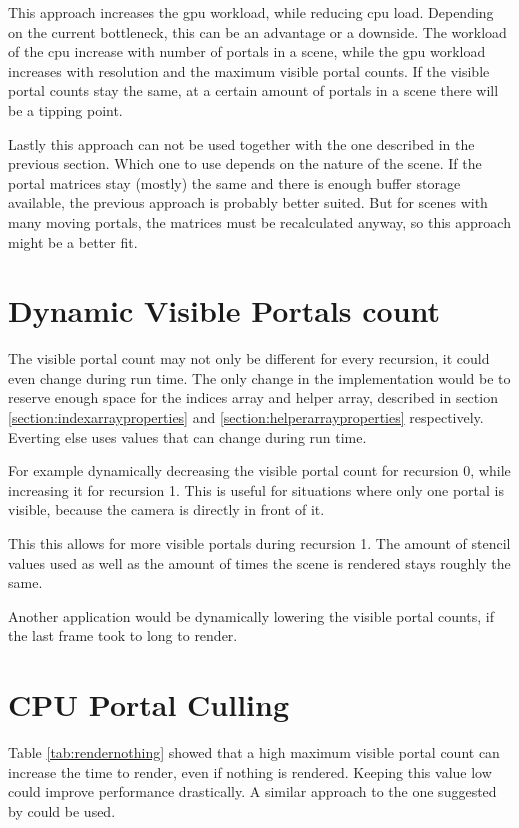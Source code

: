 This approach increases the \gls{gpu} workload, while reducing \gls{cpu} load. Depending on the current bottleneck, this can be an advantage or a downside. The workload of the \gls{cpu} increase with number of portals in a scene, while the \gls{gpu} workload increases with resolution and the maximum visible portal counts. If the visible portal counts stay the same, at a certain amount of portals in a scene there will be a tipping point.

Lastly this approach can not be used together with the one described in the previous section. Which one to use depends on the nature of the scene. If the portal matrices stay (mostly) the same and there is enough buffer storage available, the previous approach is probably better suited. But for scenes with many moving portals, the matrices must be recalculated anyway, so this approach might be a better fit. 








\section{Dynamic Visible Portals count}
The visible portal count may not only be different for every recursion, it could even change during run time. The only change in the implementation would be to reserve enough space for the indices array and helper array, described in section \ref{section:indexarrayproperties} and \ref{section:helperarrayproperties} respectively. Everting else uses values that can change during run time.

For example dynamically decreasing the visible portal count for recursion 0, while increasing it for recursion 1. This is useful for situations where only one portal is visible, because the camera is directly in front of it.

This this allows for more visible portals during recursion 1. The amount of stencil values used as well as the amount of times the scene is rendered stays roughly the same.

Another application would be dynamically lowering the visible portal counts, if the last frame took to long to render.

\section{CPU Portal Culling}
\label{section:cullingportals}
Table \ref{tab:rendernothing} showed that a high maximum visible portal count can increase the time to render, even if nothing is rendered. Keeping this value low could improve performance drastically. A similar approach to the one suggested by \cite{luebke:1995:portals} could be used.

